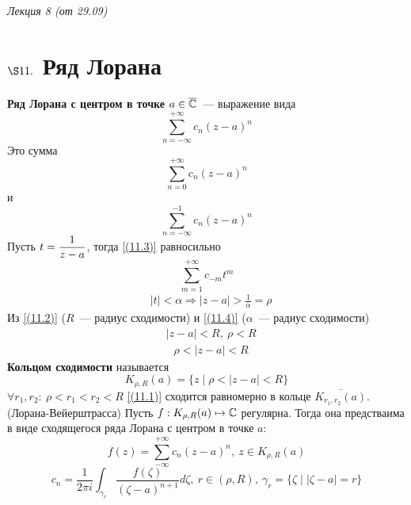 \begin{flushright}
    \textit{Лекция 8 (от 29.09)}
\end{flushright}
\section{$\S 11.$ Ряд Лорана}
\Def \textbf{Ряд Лорана с центром в точке $a \in \overline{\mathbb{C}}$}~--- выражение вида
\begin{equation}\label{(11.1)}
    \sum_{n=-\infty}^{+\infty}c_n(z-a)^n
\end{equation}
Это сумма
\begin{equation}\label{(11.2)}
    \sum_{n=0}^{+\infty}c_n(z-a)^n
\end{equation}
и
\begin{equation}\label{(11.3)}
    \sum_{n=-\infty}^{-1}c_n(z-a)^n
\end{equation}
Пусть $t = \displaystyle \frac{1}{z-a}$, тогда \eqref{(11.3)} равносильно
\begin{equation}\label{(11.4)}
    \sum_{m=1}^{+\infty}c_{-m}t^m
\end{equation}
\begin{align*}
  & \left| t \right| < \alpha \Rightarrow \left| z - a \right| > \frac{1}{\alpha} = \rho
\end{align*}
Из \eqref{(11.2)} ($R$~--- радиус сходимости) и \eqref{(11.4)} ($\alpha$~---
радиус сходимости)
\begin{align*}
  & \left| z-a \right|<R, \ \rho < R
\end{align*}
\begin{align*}
  & \rho < \left| z-a \right| < R
\end{align*}
\textbf{Кольцом сходимости} называется
\begin{equation}\label{(11.5)}
    K_{\rho, R}(a) = \{z \mid \rho < \left| z-a \right| < R\}
\end{equation}
$\forall r_1, r_2: \ \rho < r_1 < r_2 < R$ \eqref{(11.1)} сходится
равномерно в кольце $\overline{K_{r_1,r_2}(a)}$.
\theorem (Лорана-Вейерштрасса)
Пусть $f: K_{\rho,R}(a) \mapsto \mathbb{C}$ регулярна. Тогда она предстваима в виде
сходящегося ряда Лорана с центром в точке $a$:
\begin{equation}\label{(11.6)}
    f(z) = \sum_{-\infty}^{+\infty}c_n(z-a)^n, \ z \in K_{\rho,R}(a)
\end{equation}
\begin{equation}\label{(11.7)}
    c_n = \frac{1}{2\pi i}\int_{\gamma_r}\frac{f(\zeta)}{(\zeta - a)^{n+1}}d\zeta, \ r \in (\rho, R), \ \gamma_r = \{\zeta \mid \left| \zeta - a \right| = r\}
\end{equation}

